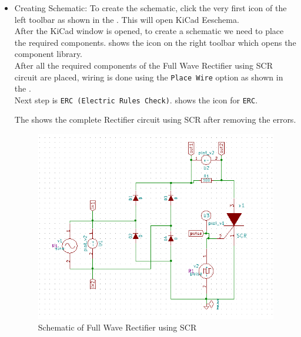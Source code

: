 \begin{itemize}

\item Creating Schematic:  To create the schematic, click the very first icon of the left toolbar as shown in the . This will open KiCad Eeschema.\\
After the KiCad window is opened, to create a schematic we need to place the required components.  shows the icon on the right toolbar which opens the component library.\\
After all the required components of the Full Wave Rectifier using SCR circuit are placed, wiring is done using the {\tt Place Wire} option as shown in the .\\
Next step is {\tt ERC (Electric Rules Check)}.  shows the icon for {\tt ERC}.

The  shows the complete Rectifier circuit using SCR after removing the errors.
\begin{figure}[!htp]
    \centering
    \includegraphics[width=\hgfig]{figures/fwrscr_schematic.png}
    \caption{Schematic of Full Wave Rectifier using SCR}
    \label{fwrscr_schematic}
\end{figure}


\end{itemize}

